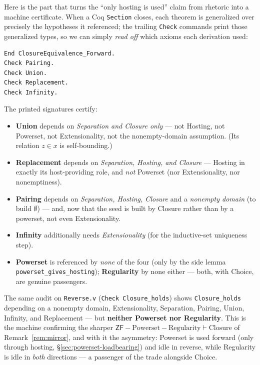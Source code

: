 \documentclass[11pt]{article}
\theoremstyle{plain}
\theoremstyle{definition}
\newcommand{\ZF}{\mathsf{ZF}}
\renewcommand{\ZF}{\textsf{ZF}}
\newcommand{\proves}{\vdash}
\newcommand{\cq}[1]{\lstinline[basicstyle=\ttfamily]|#1|}
\begin{document}
Here is the part that turns the ``only hosting is used'' claim from rhetoric into a
machine certificate. When a Coq \cq{Section} closes, each theorem is generalized over
precisely the hypotheses it referenced; the trailing \cq{Check} commands print those
generalized types, so we can simply \emph{read off} which axioms each derivation
used:

\begin{lstlisting}
End ClosureEquivalence_Forward.
Check Pairing.
Check Union.
Check Replacement.
Check Infinity.
\end{lstlisting}

The printed signatures certify:

\begin{itemize}[leftmargin=1.4em]
\item \textbf{Union} depends on \emph{Separation and Closure only} --- not
  Hosting, not Powerset, not Extensionality, not the nonempty-domain assumption.
  (Its relation $z\in x$ is self-bounding.)
\item \textbf{Replacement} depends on \emph{Separation, Hosting, and Closure} ---
  Hosting in exactly its host-providing role, and \emph{not} Powerset (nor
  Extensionality, nor nonemptiness).
\item \textbf{Pairing} depends on \emph{Separation, Hosting, Closure} and a
  \emph{nonempty domain} (to build $\emptyset$) --- and, now that the seed is built
  by Closure rather than by a powerset, not even Extensionality.
\item \textbf{Infinity} additionally needs \emph{Extensionality} (for the
  inductive-set uniqueness step).
\item \textbf{Powerset} is referenced by \emph{none} of the four (only by the side
  lemma \cq{powerset_gives_hosting}); \textbf{Regularity} by none either --- both,
  with Choice, are genuine passengers.
\end{itemize}

The same audit on \texttt{Reverse.v} (\cq{Check Closure_holds}) shows
\cq{Closure_holds} depending on a nonempty domain, Extensionality, Separation,
Pairing, Union, Infinity, and Replacement --- but \textbf{neither Powerset nor
Regularity}. This is the machine confirming the sharper
$\ZF - \text{Powerset} - \text{Regularity} \proves \text{Closure}$ of
Remark~\ref{rem:mirror}, and with it the asymmetry: Powerset is used forward (only
through hosting, \S\ref{sec:powerset-loadbearing}) and idle in reverse, while
Regularity is idle in \emph{both} directions --- a passenger of the trade alongside
Choice.
\end{document}
